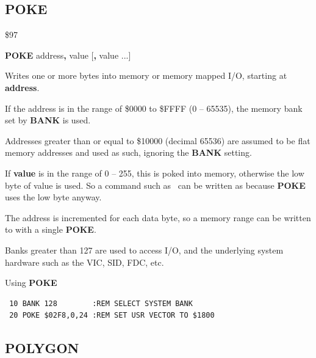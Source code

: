 \subsection{POKE}
\begin{description}[leftmargin=2cm,style=nextline]
\item [Token:] \$97
\item [Format:] {\bf POKE} address{\bf,} value [{\bf,} value ...]
\item [Returns:]  Writes one or more bytes into memory
                or memory mapped I/O, starting at {\bf address}.

                If the address is in the range of \$0000 to \$FFFF (0 -- 65535), the
                memory bank set by {\bf BANK} is used.

                Addresses greater than or equal to \$10000 (decimal 65536) are assumed to be flat memory
                addresses and used as such, ignoring the {\bf BANK} setting.

                If {\bf value} is in the range of 0 -- 255, this is poked into memory,
                otherwise the low byte of value is used. So a command such as
                 can be written as
                 because {\bf POKE} uses the low byte anyway.

\item [Remarks:] The address is incremented for each data byte,
                 so a memory range can be written to with a single {\bf POKE}.

                 Banks greater than 127 are used to access I/O, and the underlying system hardware such as the
                 VIC, SID, FDC, etc.

\item [Example:] Using {\bf POKE}

\begin{tcolorbox}[colback=black,coltext=white]
\verbatimfont{\codefont}
\begin{verbatim}
 10 BANK 128        :REM SELECT SYSTEM BANK
 20 POKE $02F8,0,24 :REM SET USR VECTOR TO $1800
\end{verbatim}
\end{tcolorbox}
\end{description}


\newpage
\subsection{POLYGON}

